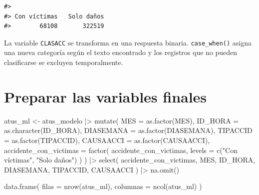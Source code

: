 \documentclass[
  spanish,
  10.5pt,
  letterpaper,
  openany,
  headings=big]{scrbook}
\newenvironment{Shaded}{}{}
\newcommand{\AttributeTok}[1]{\textcolor[rgb]{0.84,0.23,0.29}{#1}}
\newcommand{\FunctionTok}[1]{\textcolor[rgb]{0.44,0.26,0.76}{#1}}
\newcommand{\NormalTok}[1]{\textcolor[rgb]{0.14,0.16,0.18}{#1}}
\newcommand{\OtherTok}[1]{\textcolor[rgb]{0.44,0.26,0.76}{#1}}
\newcommand{\SpecialCharTok}[1]{\textcolor[rgb]{0.00,0.36,0.77}{#1}}
\newcommand{\StringTok}[1]{\textcolor[rgb]{0.01,0.18,0.38}{#1}}
\begin{document}
\begin{verbatim}
#> 
#> Con víctimas   Solo daños 
#>        68108       322519
\end{verbatim}

\begin{tcolorbox}[enhanced jigsaw, arc=.35mm, bottomrule=.15mm, bottomtitle=1mm, breakable, colback=white, colbacktitle=quarto-callout-note-color!10!white, colframe=quarto-callout-note-color-frame, coltitle=black, left=2mm, leftrule=.75mm, opacityback=0, opacitybacktitle=0.6, rightrule=.15mm, title=\textcolor{quarto-callout-note-color}{\faInfo}\hspace{0.5em}{Explicación del código}, titlerule=0mm, toprule=.15mm, toptitle=1mm]

La variable \texttt{CLASACC} se transforma en una respuesta binaria.
\texttt{case\_when()} asigna una nueva categoría según el texto
encontrado y los registros que no pueden clasificarse se excluyen
temporalmente.

\end{tcolorbox}

\section{Preparar las variables
finales}\label{preparar-las-variables-finales}

\begin{Shaded}
\begin{Highlighting}[]
\NormalTok{atus\_ml }\OtherTok{\textless{}{-}}\NormalTok{ atus\_modelo }\SpecialCharTok{|\textgreater{}}
  \FunctionTok{mutate}\NormalTok{(}
    \AttributeTok{MES =} \FunctionTok{as.factor}\NormalTok{(MES),}
    \AttributeTok{ID\_HORA =} \FunctionTok{as.character}\NormalTok{(ID\_HORA),}
    \AttributeTok{DIASEMANA =} \FunctionTok{as.factor}\NormalTok{(DIASEMANA),}
    \AttributeTok{TIPACCID =} \FunctionTok{as.factor}\NormalTok{(TIPACCID),}
    \AttributeTok{CAUSAACCI =} \FunctionTok{as.factor}\NormalTok{(CAUSAACCI),}
    \AttributeTok{accidente\_con\_victimas =} \FunctionTok{factor}\NormalTok{(}
\NormalTok{      accidente\_con\_victimas,}
      \AttributeTok{levels =} \FunctionTok{c}\NormalTok{(}\StringTok{"Con víctimas"}\NormalTok{, }\StringTok{"Solo daños"}\NormalTok{)}
\NormalTok{    )}
\NormalTok{  ) }\SpecialCharTok{|\textgreater{}}
  \FunctionTok{select}\NormalTok{(}
\NormalTok{    accidente\_con\_victimas,}
\NormalTok{    MES,}
\NormalTok{    ID\_HORA,}
\NormalTok{    DIASEMANA,}
\NormalTok{    TIPACCID,}
\NormalTok{    CAUSAACCI}
\NormalTok{  ) }\SpecialCharTok{|\textgreater{}}
  \FunctionTok{na.omit}\NormalTok{()}

\FunctionTok{data.frame}\NormalTok{(}
  \AttributeTok{filas =} \FunctionTok{nrow}\NormalTok{(atus\_ml),}
  \AttributeTok{columnas =} \FunctionTok{ncol}\NormalTok{(atus\_ml)}
\NormalTok{)}
\end{Highlighting}
\end{Shaded}
\end{document}
